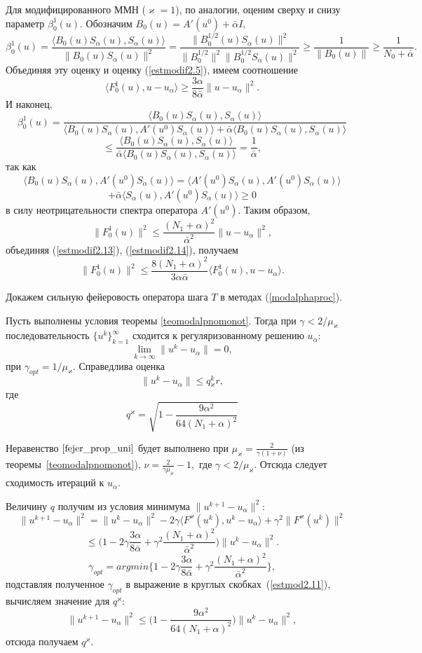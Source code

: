 Для модифицированного ММН ($\varkappa=1$), по аналогии, оценим сверху и снизу параметр $\beta_0^1(u)$. Обозначим $B_0(u)=A'(u^0)+\bar{\alpha}I,$
$$\beta_0^1(u)=\frac{\langle B_0(u)S_\alpha(u), S_\alpha(u)\rangle}{\|B_0(u)S_\alpha(u)\|^2}=\frac{\|B_0^{1/2}(u)S_\alpha(u)\|^2}{\|B_0^{1/2}\|^2\|B_0^{1/2}S_\alpha(u)\|^2}\ge\frac{1}{\|B_0(u)\|}\ge\frac{1}{N_0+\bar{\alpha}}.$$
Объединяя эту оценку и оценку (\ref{estmodif2.5}), имеем соотношение
\begin{equation}\label{estmodif2.13}
\langle F_0^1(u), u-u_\alpha\rangle\ge\frac{3\alpha}{8\bar{\alpha}}\|u-u_\alpha\|^2.
\end{equation}
И наконец,
$$\beta_0^1(u)=\frac{\langle B_0(u)S_\alpha(u), S_\alpha(u)\rangle}{\langle B_0(u)S_\alpha(u), A'(u^0)S_\alpha(u)\rangle+\bar{\alpha}\langle B_0(u)S_\alpha(u), S_\alpha(u)\rangle}$$
$$\le\frac{\langle B_0(u)S_\alpha(u), S_\alpha(u)\rangle}{\bar{\alpha}\langle B_0(u)S_\alpha(u), S_\alpha(u)\rangle}=\frac{1}{\bar{\alpha}},$$
так как $$\langle B_0(u)S_\alpha(u), A'(u^0)S_\alpha(u)\rangle=\langle A'(u^0)S_\alpha(u), A'(u^0)S_\alpha(u)\rangle$$$$+\bar{\alpha}\langle S_\alpha(u), A'(u^0)S_\alpha(u)\rangle\ge 0$$ в силу неотрицательности спектра оператора $A'(u^0)$. Таким образом,
\begin{equation}\label{estmodif2.14}
\|F_0^1(u)\|^2\le\frac{(N_1+\alpha)^2}{\bar{\alpha}^2}\|u-u_\alpha\|^2,
\end{equation}
объединяя (\ref{estmodif2.13}), (\ref{estmodif2.14}), получаем
$$\|F_0^1(u)\|^2\le\frac{8(N_1+\alpha)^2}{3\alpha\bar{\alpha}}\langle F_0^1(u), u-u_\alpha\rangle.$$

Докажем сильную фейеровость оператора шага $T$ в методах (\ref{modalphaproc}).
\begin{theorem}
	Пусть выполнены условия теоремы \ref{teomodalpnomonot}. Тогда при $\gamma < 2/\mu_\varkappa$ последовательность $\{u^k\}_{k=1}^\infty$ сходится к регуляризованному решению $u_\alpha$: $$\lim\limits_{k\to\infty}\|u^k-u_\alpha\|=0,$$ при $\gamma_{opt}=1/\mu_\varkappa.$ Справедлива оценка $$\|u^k-u_\alpha\|\le q{_\varkappa^k}r,$$ где
	$$q^\varkappa=\sqrt{1-\frac{9\alpha^2}{64(N_1+\alpha)^2}}$$
\end{theorem}
\proof Неравенство $\eqref{fejer_prop_uni}$ будет выполнено при $\mu_\varkappa=\frac{2}{\gamma(1+\nu)}$ (из теоремы~\ref{teomodalpnomonot}), $\nu=\frac{2}{\gamma\mu_\varkappa}-1,$ где $\gamma<2/\mu_\varkappa$. Отсюда следует сходимость итераций к $u_\alpha$.

Величину $q$ получим из условия минимума $\|u^{k+1}-u_\alpha\|^2$:
$$\|u^{k+1}-u_\alpha\|^2=\|u^k-u_\alpha\|^2-2\gamma\langle F^\varkappa(u^k), u^k-u_\alpha\rangle+\gamma^2\|F^\varkappa(u^k)\|^2$$
\begin{equation}\label{estmod2.11}
\le\big(1-2\gamma\frac{3\alpha}{8\bar{\alpha}}+\gamma^2\frac{(N_1+\alpha)^2}{\bar{\alpha}^2}\big)\|u^k-u_\alpha\|^2.
\end{equation}
$$\gamma_{opt}=argmin\{1-2\gamma\frac{3\alpha}{8\bar{\alpha}}+\gamma^2\frac{(N_1+\alpha)^2}{\bar{\alpha}^2}\},$$
подставляя полученное $\gamma_{opt}$ в выражение в круглых скобках~(\ref{estmod2.11}), вычисляем значение для $q^\varkappa$:
$$\|u^{k+1}-u_\alpha\|^2\le\big(1-\frac{9\alpha^2}{64(N_1+\alpha)^2}\big)\|u^k-u_\alpha\|^2,$$ отсюда получаем $q^\varkappa$.

